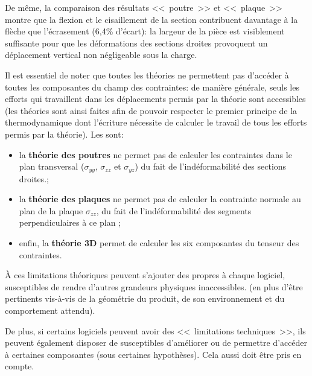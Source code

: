 De même, la comparaison des résultats <<~poutre~>> et <<~plaque~>> montre que la flexion et le 
cisaillement de la section contribuent davantage à la flèche que l'écrasement (6,4\% d'écart): 
la largeur de la pièce est visiblement suffisante pour que les déformations des sections droites 
provoquent un déplacement vertical non négligeable sous la charge.

\medskip
Il est essentiel de noter que toutes les théories ne permettent pas d'accéder à toutes les 
composantes du champ des contraintes: de manière générale, seuls les efforts qui travaillent 
dans les déplacements permis par la théorie sont accessibles (les théories sont ainsi faites 
afin de pouvoir respecter le premier principe de la thermodynamique dont l'écriture nécessite 
de calculer le travail de tous les efforts permis par la théorie).
Les  sont:
\begin{itemize}
   \item la \textbf{théorie des poutres} ne permet pas de calculer les contraintes dans le plan 
	transversal ($\sigma_{yy}$, $\sigma_{zz}$ et $\sigma_{yz}$) du fait de l'indéformabilité 
	des sections droites.;
   \item la \textbf{théorie des plaques} ne permet pas de calculer la contrainte normale au plan de la plaque 
	$\sigma_{zz}$, du fait de l'indéformabilité des segments perpendiculaires à ce plan ;
   \item enfin, la \textbf{théorie 3D} permet de calculer les six composantes du tenseur des contraintes.
\end{itemize}

\medskip
À ces limitations théoriques peuvent s'ajouter des  
propres à chaque logiciel, susceptibles de rendre d'autres grandeurs physiques inaccessibles. 
 (en plus d'être pertinents vis-à-vis de la géométrie du produit, de son environnement 
et du comportement attendu).

De plus, si certains logiciels peuvent avoir des <<~limitations techniques~>>, ils peuvent
également disposer de  susceptibles d'améliorer 
ou de permettre d'accéder à certaines composantes (sous certaines hypothèses). Cela aussi
doit être pris en compte.




